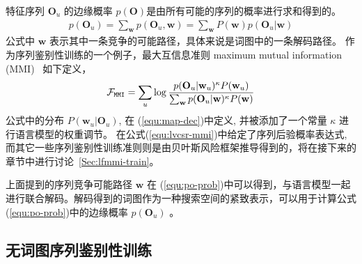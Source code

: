 特征序列 $\mathbf{O}_u$ 的边缘概率 $p(\mathbf{O})$是由所有可能的序列的概率进行求和得到的。
\begin{equation}
\label{equ:po-prob}
\begin{split}
p(\mathbf{O}_u)=\sum_\mathbf{w} p(\mathbf{O}_u,\mathbf{w})= \sum_\mathbf{w} P(\mathbf{w}) p(\mathbf{O}_u|\mathbf{w})
\end{split}
\end{equation}
公式中 $\mathbf{w}$ 表示其中一条竞争的可能路径，具体来说是词图中的一条解码路径。
作为序列鉴别性训练的一个例子，最大互信息准则 maximum mutual information (MMI)~\cite{bahl1986maximum} 如下定义，
\begin{equation}
\label{equ:lvcsr-mmi}
\begin{split}
\mathcal{F}_{\tt{MMI}}%
=\sum_{u} \log \frac {p(\mathbf{O}_u|\mathbf{w}_u)^{\kappa}P(\mathbf{w}_u)}{\sum_{\mathbf{w}} p(\mathbf{O}_u|\mathbf{w})^{\kappa}P(\mathbf{w})}  
\end{split}
\end{equation}
公式中的分布 $P(\mathbf{w}_u|\mathbf{O}_u)$, 在 (\ref{equ:map-dec})中定义, 并被添加了一个常量 $\kappa$ 进行语言模型的权重调节。 %
在公式(\ref{equ:lvcsr-mmi})中给定了序列后验概率表达式, 而其它一些序列鉴别性训练准则则是由贝叶斯风险框架推导得到的，将在接下来的章节中进行讨论~\ref{Sec:lfmmi-train}。


上面提到的序列竞争可能路径 $\mathbf{w}$ 在 (\ref{equ:po-prob})中可以得到，与语言模型一起进行联合解码。解码得到的词图作为一种搜索空间的紧致表示，可以用于计算公式(\ref{equ:po-prob})中的边缘概率 $p(\mathbf{O}_u)$ 。

  



\subsection{无词图序列鉴别性训练}
\label{chap:intro2-e2e-lfmmi}

